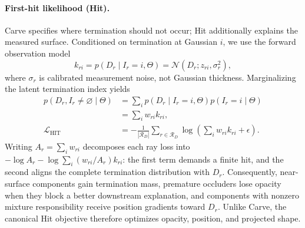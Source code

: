 \paragraph{First-hit likelihood (Hit).}
Carve specifies where termination should not occur; Hit additionally explains
the measured surface. Conditioned on termination at Gaussian $i$, we use the
forward observation model
\begin{equation}\label{eq:hit_observation}
  k_{ri}=p(D_r\mid I_r=i,\Theta)
  =\mathcal N(D_r;z_{ri},\sigma_r^2),
\end{equation}
where $\sigma_r$ is calibrated measurement noise, not Gaussian thickness.
Marginalizing the latent termination index yields
\begin{align}
  p(D_r,I_r\neq\varnothing\mid\Theta)
  &=\sum_i p(D_r\mid I_r=i,\Theta)p(I_r=i\mid\Theta) \nonumber\\
  &=\sum_iw_{ri}k_{ri}, \label{eq:hit_likelihood}\\
  \mathcal L_{\mathrm{HIT}}
  &=-\frac{1}{|\mathcal R_D|}\sum_{r\in\mathcal R_D}
  \log\!\left(\sum_iw_{ri}k_{ri}+\epsilon\right). \nonumber
\end{align}
Writing $A_r=\sum_iw_{ri}$ decomposes each ray loss into
$-\log A_r-\log\sum_i(w_{ri}/A_r)k_{ri}$: the first term demands a finite hit,
and the second aligns the complete termination distribution with $D_r$.
Consequently, near-surface components gain termination mass, premature
occluders lose opacity when they block a better downstream explanation, and
components with nonzero mixture responsibility receive position gradients
toward $D_r$. Unlike Carve, the canonical Hit objective therefore optimizes
opacity, position, and projected shape.

